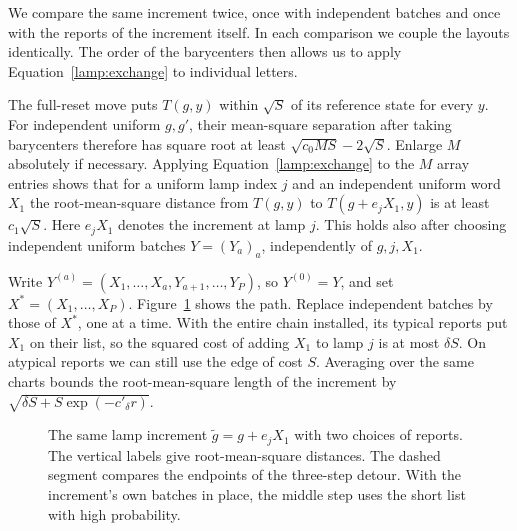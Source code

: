 We compare the same increment twice, once with independent batches
and once with the reports of the increment itself. In each comparison
we couple the layouts identically. The order of the barycenters then
allows us to apply Equation~\eqref{lamp:exchange} to individual letters.

The full-reset move puts \(T(g,y)\) within \(\sqrt S\) of its reference
state for every \(y\). For independent uniform \(g,g'\), their mean-square
separation after taking barycenters therefore has square root at least
\(\sqrt{c_0MS}-2\sqrt S\). Enlarge \(M\) absolutely if necessary.
Applying Equation~\eqref{lamp:exchange} to the \(M\) array entries shows that
for a uniform lamp index \(j\) and an independent uniform word \(X_1\)
the root-mean-square distance from \(T(g,y)\) to
\(T(g+e_jX_1,y)\) is at least \(c_1\sqrt S\). Here \(e_jX_1\) denotes
the increment at lamp \(j\). This holds also after choosing independent
uniform batches \(Y=(Y_a)_a\), independently of \(g,j,X_1\).

Write \(Y^{(a)}=(X_1,\ldots,X_a,Y_{a+1},\ldots,Y_P)\), so
\(Y^{(0)}=Y\), and set \(X^*=(X_1,\ldots,X_P)\). Figure~\ref{lamp:fig-path}
shows the path. Replace independent batches by those of \(X^*\), one
at a time. With the entire chain installed, its typical reports put
\(X_1\) on their list, so the squared cost of adding \(X_1\) to lamp
\(j\) is at most \(\delta S\). On atypical reports we can still use
the edge of cost \(S\). Averaging over the same charts bounds the
root-mean-square length of the increment by
\(\sqrt{\delta S+S\exp(-c'_\delta r)}\).

\begin{figure}[tbp]
\centering
{}
\caption{The same lamp increment \(\widetilde g=g+e_jX_1\) with two
choices of reports. The vertical labels give root-mean-square distances.
The dashed segment compares the endpoints of the three-step detour.
With the increment's own batches in place, the middle step uses the
short list with high probability.}
\label{lamp:fig-path}
\end{figure}


